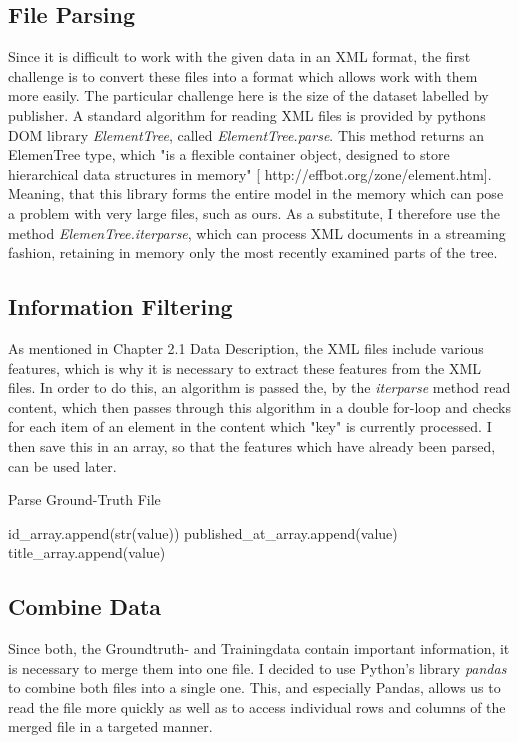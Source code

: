 \documentclass[a4paper, 11pt,titlepage,oneside,openany]{book}
\begin{document}
\subsection{File Parsing}
Since it is difficult to work with the given data in an XML format, the first challenge is to convert these files into a format which allows work with them more easily. The particular challenge here is the size of the dataset labelled by publisher. A standard algorithm for reading XML files is provided by pythons DOM library \textit{ElementTree}, called \textit{ElementTree.parse}\cite{parse}. This method returns an ElemenTree type, which "is a flexible container object, designed to store hierarchical data structures in memory" [ http://effbot.org/zone/element.htm]. Meaning, that this library forms the entire model in the memory which can pose a problem with very large files, such as ours. As a substitute, I therefore use the method \textit{ElemenTree.iterparse}, which can process XML documents in a streaming fashion, retaining in memory only the most recently examined parts of the tree\cite{iterparse}. 


\subsection{Information Filtering}
As mentioned in Chapter 2.1 Data Description, the XML files include various features, which is why it is necessary to extract these features from the XML files. In order to do this,  an algorithm  is passed the, by the \textit{iterparse} method read content, which then passes through this algorithm in a double for-loop and checks for each item of an element in the content which "key" is currently processed. I then save this in an array, so that the features which have already been parsed, can be used later. \\

\begin{algorithm}[H]
	\DontPrintSemicolon
	\caption{Parse Ground-Truth File}
		{
			{
				{id\_array.append(str(value))}
				{published\_at\_array.append(value)}
				{title\_array.append(value)}
			}
		}
\end{algorithm}

\subsection{Combine Data}
Since both, the Groundtruth- and Trainingdata contain important information, it is necessary to merge them into one file. I decided to use Python's library \textit{pandas} \cite{pandas} to combine both files into a single one. This, and especially Pandas, allows us to read the file more quickly as well as to access individual rows and columns of the merged file in a targeted manner.\\
\end{document}
